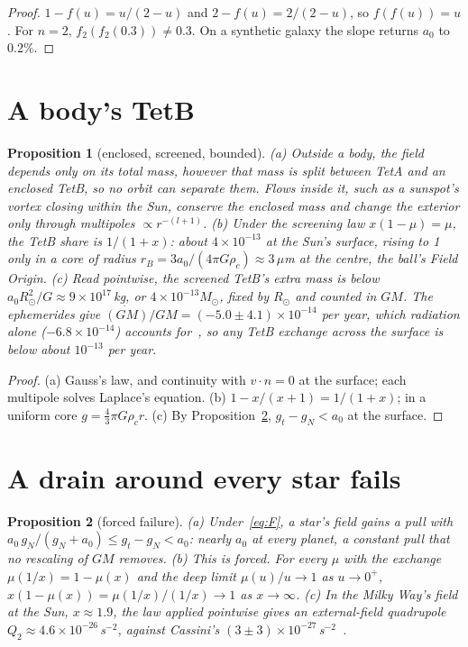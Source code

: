 \documentclass[twocolumn]{iopjournal}
\newtheorem{proposition}{Proposition}
\theoremstyle{definition}
\theoremstyle{remark}
\begin{document}
\begin{proof}
$1 - f(u) = u/(2-u)$ and $2 - f(u) = 2/(2-u)$, so $f(f(u)) = u$. For
$n = 2$, $f_2(f_2(0.3)) \neq 0.3$. On a synthetic galaxy the slope
returns $a_0$ to $0.2\%$.
\end{proof}

\section*{A body's TetB}

\begin{proposition}[enclosed, screened, bounded]\label{prop:body}
(a) Outside a body, the field depends only on its total mass, however
that mass is split between TetA and an enclosed TetB, so no orbit can
separate them. Flows inside it, such as a sunspot's vortex closing
within the Sun, conserve the enclosed mass and change the exterior only
through multipoles $\propto r^{-(l+1)}$. (b) Under the screening law
$x(1-\mu) = \mu$, the TetB share is $1/(1+x)$: about
$4 \times 10^{-13}$ at the Sun's surface, rising to 1 only in a core of
radius $r_B = 3a_0/(4\pi G\rho_c) \approx 3\,\mu$m at the centre, the
ball's Field Origin. (c) Read pointwise, the screened TetB's extra mass
is below $a_0R_\odot^2/G \approx 9 \times 10^{17}$\,kg, or
$4 \times 10^{-13} M_\odot$, fixed by $R_\odot$ and counted in $GM$. The
ephemerides give $\dot{(GM)}/GM = (-5.0 \pm 4.1)\times10^{-14}$ per year,
which radiation alone ($-6.8\times10^{-14}$) accounts
for~\cite{Pitjeva2012}, so any TetB exchange across the surface is below
about $10^{-13}$ per year.
\end{proposition}

\begin{proof}
(a) Gauss's law, and continuity with $v\cdot n = 0$ at the surface;
each multipole solves Laplace's equation. (b) $1 - x/(x+1) = 1/(1+x)$;
in a uniform core $g = \tfrac43\pi G\rho_c r$. (c) By
Proposition~\ref{prop:tail}, $g_t - g_N < a_0$ at the surface.
\end{proof}

\section*{A drain around every star fails}

\begin{proposition}[forced failure]\label{prop:tail}
(a) Under~\eqref{eq:F}, a star's field gains a pull with
$a_0\,g_N/(g_N + a_0) \le g_t - g_N < a_0$: nearly $a_0$ at every planet,
a constant pull that no rescaling of $GM$ removes. (b) This is forced.
For every $\mu$ with the exchange $\mu(1/x) = 1 - \mu(x)$ and the deep
limit $\mu(u)/u \to 1$ as $u \to 0^+$, $x(1-\mu(x)) = \mu(1/x)/(1/x)
\to 1$ as $x \to \infty$. (c) In the Milky Way's field at the Sun,
$x \approx 1.9$, the law applied pointwise gives an external-field
quadrupole $Q_2 \approx 4.6 \times 10^{-26}$\,s$^{-2}$, against
Cassini's $(3 \pm 3) \times 10^{-27}$\,s$^{-2}$~\cite{Hees2014}.
\end{proposition}
\end{document}
